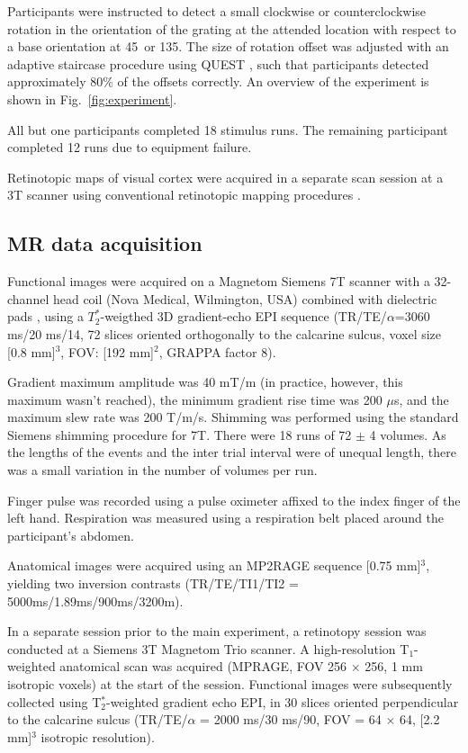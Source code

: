 Participants were instructed to detect a small clockwise or counterclockwise rotation in the orientation of the grating at the attended location with respect to a base orientation at 45\textdegree~or 135\textdegree. The size of rotation offset was adjusted with an adaptive staircase procedure using QUEST \cite{Watson1983}, such that participants detected approximately 80\% of the offsets correctly. An overview of the experiment is shown in Fig.~\ref{fig:experiment}.

All but one participants completed 18 stimulus runs. The remaining participant completed 12 runs due to equipment failure.

Retinotopic maps of visual cortex were acquired in a separate scan session at a 3T scanner using conventional retinotopic mapping procedures \cite{Sereno1995,DeYoe1996,Engel1997}. 


\subsection{MR data acquisition}
Functional images were acquired on a Magnetom Siemens 7T scanner with a 32-channel head coil (Nova Medical, Wilmington, USA) combined with dielectric pads \cite{Teeuwisse2012}, using a $T_2^*$-weigthed 3D gradient-echo EPI sequence \cite{Poser2010} (TR/TE/$\alpha$=3060 ms/20 ms/14\textdegree, 72 slices oriented orthogonally to the calcarine sulcus, voxel size [0.8 mm]$^3$, FOV: [192 mm]$^2 $, GRAPPA factor 8).

Gradient maximum amplitude was 40 mT/m (in practice, however, this maximum wasn't reached), the minimum gradient rise time was 200 $\mu$s, and the maximum slew rate was 200 T/m/s. Shimming was performed using the standard Siemens shimming procedure for 7T. There were 18 runs of 72 $\pm$ 4 volumes. As the lengths of the events and the inter trial interval were of unequal length, there was a small variation in the number of volumes per run.

Finger pulse was recorded using a pulse oximeter affixed to the index finger of the left hand. Respiration was measured using a respiration belt placed around the participant's abdomen.

Anatomical images were acquired using an MP2RAGE sequence \cite{Marques2010} [0.75 mm]$^3$, yielding two inversion contrasts (TR/TE/TI1/TI2 = 5000ms/1.89ms/900ms/3200m).

In a separate session prior to the main experiment, a retinotopy session was conducted at a Siemens 3T Magnetom Trio scanner. A high-resolution T$_1$-weighted anatomical scan was acquired (MPRAGE, FOV 256 $\times$ 256, 1 mm isotropic voxels) at the start of the session. Functional images were subsequently collected using T$_2^*$-weighted gradient echo EPI, in 30 slices oriented perpendicular to the calcarine sulcus (TR/TE/$\alpha$ = 2000 ms/30 ms/90\textdegree, FOV = 64 $\times$ 64, [2.2 mm]$^3$ isotropic resolution).


